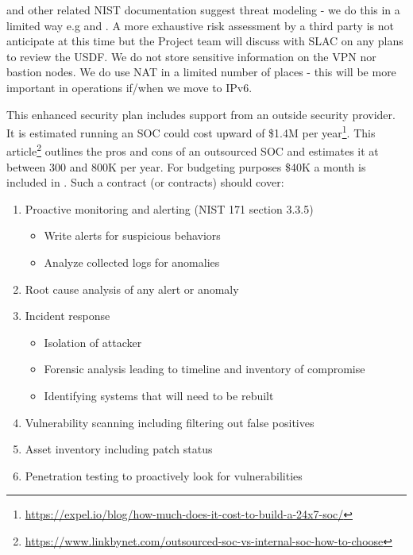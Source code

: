  and other related NIST documentation suggest threat modeling - we do this in a limited way e.g  and . A more exhaustive risk assessment by a third party is not anticipate at this time but the Project team will discuss with SLAC on any plans to review the \gls{USDF}.
We do not store sensitive information on the \gls{VPN} nor bastion nodes.
We do use \gls{NAT} in a limited number of places - this will be more important in operations if/when we move to IPv6.







This enhanced security plan includes support from an outside security provider.
It is estimated running an \gls{SOC} could cost upward of \$1.4M per year\footnote{\url{https://expel.io/blog/how-much-does-it-cost-to-build-a-24x7-soc/}}.
This article\footnote{\url{https://www.linkbynet.com/outsourced-soc-vs-internal-soc-how-to-choose}} outlines the pros and cons of
an outsourced \gls{SOC} and estimates it at between 300 and 800K per year.
For budgeting purposes  \$40K a month is included in .
Such a contract (or contracts) should cover:

\begin{enumerate}
\item Proactive \gls{monitoring} and alerting (NIST 171 section 3.3.5)
  \begin{itemize}
  \item Write alerts for suspicious behaviors
  \item Analyze collected logs for anomalies
  \end{itemize}
\item Root cause analysis of any alert or anomaly
\item \gls{Incident} response
  \begin{itemize}
  \item Isolation of attacker
  \item Forensic analysis leading to timeline and inventory of compromise
  \item Identifying systems that will need to be rebuilt
  \end{itemize}
\item Vulnerability scanning including filtering out false positives
\item Asset inventory including \gls{patch} status
\item Penetration testing to proactively look for vulnerabilities
\end{enumerate}

